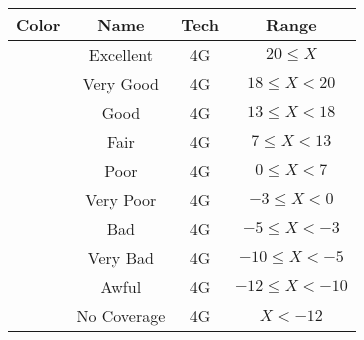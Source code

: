 \begin{tabular}{|c|c|c|c|}\hline
\rowcolor{Plum!20}
Color&Name&Tech&Range\\\hline\hline
\cellcolor[HTML]{00703c} &Excellent&4G&$20\leq X$\\\hline
\cellcolor[HTML]{00a032} &Very Good&4G&$18\leq X<20$\\\hline
\cellcolor[HTML]{00d228} &Good&4G&$13\leq X<18$\\\hline
\cellcolor[HTML]{ffff00} &Fair&4G&$7\leq X<13$\\\hline
\cellcolor[HTML]{ffaa00} &Poor&4G&$0\leq X<7$\\\hline
\cellcolor[HTML]{fa6400} &Very Poor&4G&$-3\leq X<0$\\\hline
\cellcolor[HTML]{ff0000} &Bad&4G&$-5\leq X<-3$\\\hline
\cellcolor[HTML]{dc143c} &Very Bad&4G&$-10\leq X<-5$\\\hline
\cellcolor[HTML]{820000} &Awful&4G&$-12\leq X<-10$\\\hline
\cellcolor[HTML]{aaaaaa} &No Coverage&4G&$X<-12$\\\hline
\end{tabular}
